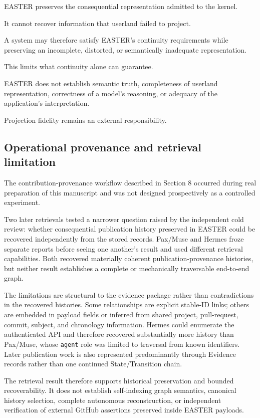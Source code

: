 \documentclass[11pt]{article}
\begin{document}
EASTER preserves the consequential representation admitted to the kernel.

It cannot recover information that userland failed to project.

A system may therefore satisfy EASTER's continuity requirements while preserving an incomplete, distorted, or semantically inadequate representation.

This limits what continuity alone can guarantee.

EASTER does not establish semantic truth, completeness of userland representation, correctness of a model's reasoning, or adequacy of the application's interpretation.

Projection fidelity remains an external responsibility.

\subsection{Operational provenance and retrieval limitation}

The contribution-provenance workflow described in Section 8 occurred during real preparation of this manuscript and was not designed prospectively as a controlled experiment.

Two later retrievals tested a narrower question raised by the independent cold review: whether consequential publication history preserved in EASTER could be recovered independently from the stored records. Pax/Muse and Hermes froze separate reports before seeing one another's result and used different retrieval capabilities. Both recovered materially coherent publication-provenance histories, but neither result establishes a complete or mechanically traversable end-to-end graph.

The limitations are structural to the evidence package rather than contradictions in the recovered histories. Some relationships are explicit stable-ID links; others are embedded in payload fields or inferred from shared project, pull-request, commit, subject, and chronology information. Hermes could enumerate the authenticated API and therefore recovered substantially more history than Pax/Muse, whose \texttt{agent} role was limited to traversal from known identifiers. Later publication work is also represented predominantly through Evidence records rather than one continued State/Transition chain.

The retrieval result therefore supports historical preservation and bounded recoverability. It does not establish self-indexing graph semantics, canonical history selection, complete autonomous reconstruction, or independent verification of external GitHub assertions preserved inside EASTER payloads.
\end{document}

